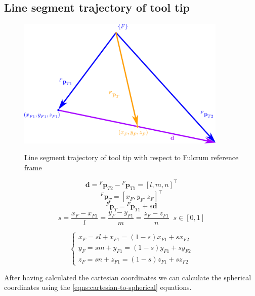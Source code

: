 \subsection{Line segment trajectory of tool tip}

\begin{center}
\begin{figure}[!htb]
\centering
\includegraphics[width=10cm]{images/line-segment-trajectory-wrt-fulcrum.png}\\
\caption{Line segment trajectory of tool tip with respect to Fulcrum reference frame}
\end{figure}
\end{center}
\[
\mathbf{d} = {}^{F}\mathbf{p}^{}_{T2} - {}^{F}\mathbf{p}^{}_{T1} = [l, m, n]^\top
\]
\[
{}^{F}\mathbf{p}^{}_{T} = [x^{}_{F}, y^{}_{F}, z^{}_{F}]^\top
\]
\[
{}^{F}\mathbf{p}^{}_{T} = {}^{F}\mathbf{p}^{}_{T1} + s\mathbf{d}
\]
\[
s = \frac{x^{}_{F} - x^{}_{F1}}{l} = \frac{y^{}_{F} - y^{}_{F1}}{m} = \frac{z^{}_{F} - z^{}_{F1}}{n} \;\; s \in [0, 1]
\]

\begin{equation}
\begin{cases}
x^{}_{F} = sl + x^{}_{F1} = (1-s)x^{}_{F1} + sx^{}_{F2} \\
y^{}_{F} = sm + y^{}_{F1} = (1-s)y^{}_{F1} + sy^{}_{F2} \\
z^{}_{F} = sn + z^{}_{F1} = (1-s)z^{}_{F1} + sz^{}_{F2}
\end{cases}
\end{equation}

After having calculated the cartesian coordinates we can calculate the spherical coordinates using the \ref{eqns:cartesian-to-spherical} equations.

